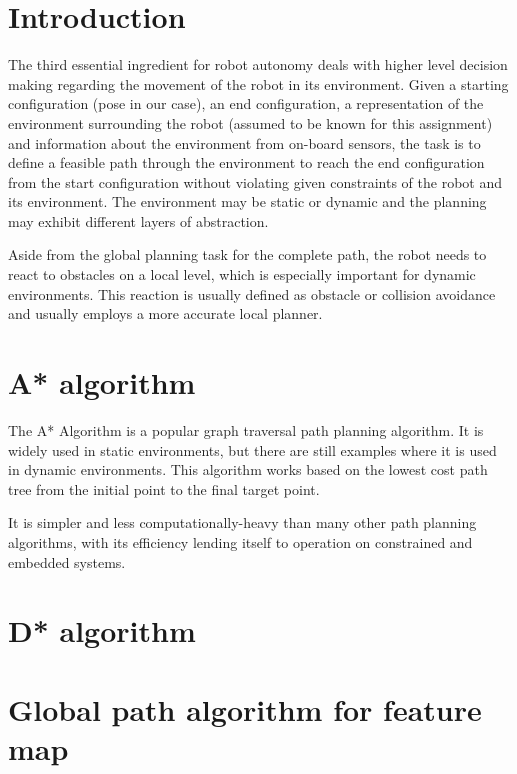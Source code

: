 \documentclass[12pt, a4paper, onecolumn]{article}
\begin{document}
\maketitle

\section{Introduction}

The third essential ingredient for robot autonomy deals with higher level decision making regarding the movement of the robot in its environment. Given a starting configuration (pose in our case), an end configuration, a representation of the environment surrounding the robot (assumed to be known for this assignment) and information about the environment from on-board sensors, the task is to define a feasible path through the environment to reach the end configuration from the start configuration without violating given constraints of the robot and its environment. The environment may be static or dynamic and the planning may exhibit different layers of abstraction. 

Aside from the global planning task for the complete path, the robot needs to react to obstacles on a local level, which is especially important for dynamic environments. This reaction is usually defined as obstacle or collision avoidance and usually employs a more accurate local planner.

\section{A* algorithm}

The A* Algorithm is a popular graph traversal path planning algorithm. It is widely used in static environments, but there are still examples where it is used in dynamic environments. This algorithm works based on the lowest cost path tree from the initial point to the final target point. \cite{Karur21}

It is simpler and less computationally-heavy than many other path planning algorithms, with its efficiency lending itself to operation on constrained and embedded systems. \cite{Karur21}

\section{D* algorithm}

\section{Global path algorithm for feature map}
\end{document}
